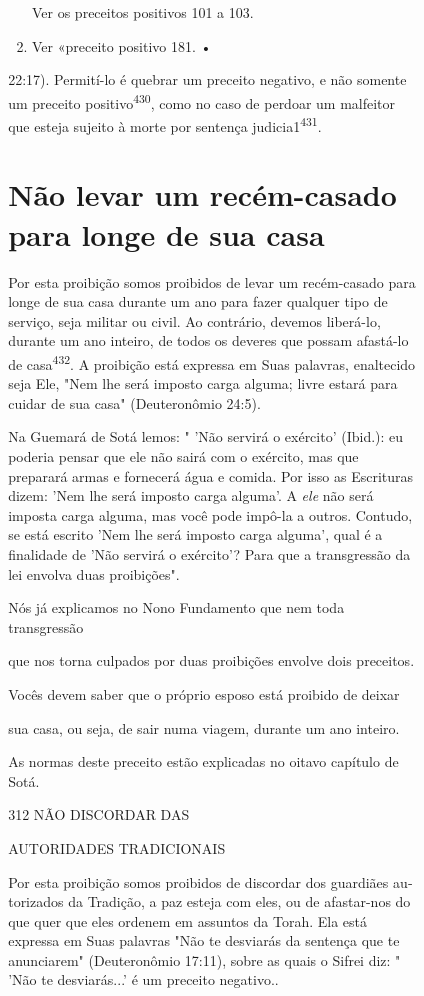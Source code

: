 \begin{itemize}
\begin{enumrate}
\begin{itemize}
\begin{itemize}
\begin{itemize}
\begin{enumerate}
 Ver os preceitos positivos 101 a 103.
 
\item
 
 Ver «preceito positivo 181. •
 
\end{enumerate}



22:17). Permití-lo é quebrar um preceito negativo, e não somente um
preceito positivo\textsuperscript{430}, como no caso de perdoar um
malfeitor que esteja sujeito à morte por sentença
judicia1\textsuperscript{431}.

\section{Não levar um recém-casado para longe de sua casa}

Por esta proibição somos proibidos de levar um recém-casado para longe
de sua casa durante um ano para fazer qualquer tipo de serviço, seja
mili­tar ou civil. Ao contrário, devemos liberá-lo, durante um ano
inteiro, de todos os deveres que possam afastá-lo de
casa\textsuperscript{432}. A proibição está expressa em Suas palavras,
enaltecido seja Ele, "Nem lhe será imposto carga alguma; livre estará
para cuidar de sua casa" (Deuteronômio 24:5).

Na Guemará de Sotá lemos: " 'Não servirá o exército' (Ibid.): eu
po­deria pensar que ele não sairá com o exército, mas que preparará
armas e for­necerá água e comida. Por isso as Escrituras dizem: 'Nem lhe
será imposto car­ga alguma'. A \emph{ele} não será imposta carga alguma,
mas você pode impô-la a ou­tros. Contudo, se está escrito 'Nem lhe será
imposto carga alguma', qual é a finalidade de 'Não servirá o exército'?
Para que a transgressão da lei envolva duas proibições".


Nós já explicamos no Nono Fundamento que nem toda transgressão


que nos torna culpados por duas proibições envolve dois preceitos.


Vocês devem saber que o próprio esposo está proibido de deixar


sua casa, ou seja, de sair numa viagem, durante um ano inteiro.


As normas deste preceito estão explicadas no oitavo capítulo de Sotá.


312 NÃO DISCORDAR DAS

AUTORIDADES TRADICIONAIS

Por esta proibição somos proibidos de discordar dos guardiães
au­torizados da Tradição, a paz esteja com eles, ou de afastar-nos do
que quer que eles ordenem em assuntos da Torah. Ela está expressa em
Suas palavras "Não te desviarás da sentença que te anunciarem"
(Deuteronômio 17:11), sobre as quais o Sifrei diz: " 'Não te
desviarás...' é um preceito negativo..


\end{itemize}
\end{itemize}
\end{itemize}
\end{enumrate}
\end{itemize}
